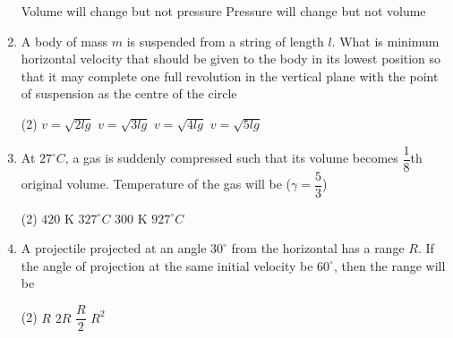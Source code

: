 \documentclass[twocolumn]{article}
\renewcommand{\frac}[2]{\dfrac{#1}{#2}}
\begin{document}
\begin{enumerate}
\begin{tasks}
        \task Volume will change but not pressure
        \task Pressure will change but not volume
    \end{tasks}
    \begin{center}
    \end{center}
    \item A body of mass \( m \) is suspended from a string of length \( l \). What is minimum horizontal velocity that should be given to the body in its lowest position so that it may complete one full revolution in the vertical plane with the point of suspension as the centre of the circle
    \begin{tasks}(2)
        \task \( v = \sqrt{2lg} \)
        \task \( v = \sqrt{3lg} \)
        \task \( v = \sqrt{4lg} \)
        \task \( v = \sqrt{5lg} \)
    \end{tasks}
    \item At \( 27^\circ C \), a gas is suddenly compressed such that its volume becomes \( \frac{1}{8} \)th original volume. Temperature of the gas will be (\( \gamma = \frac{5}{3} \))
    \begin{tasks}(2)
        \task \( 420 \) K
        \task \( 327^\circ C \)
        \task \( 300 \) K
        \task \( 927^\circ C \)
    \end{tasks}
    \item A projectile projected at an angle \( 30^\circ \) from the horizontal has a range \( R \). If the angle of projection at the same initial velocity be \( 60^\circ \), then the range will be
    \begin{tasks}(2)
        \task \( R \)
        \task \( 2R \)
        \task \( \frac{R}{2} \)
        \task \( R^2 \)
    \end{tasks}


\end{enumerate}
\end{document}
